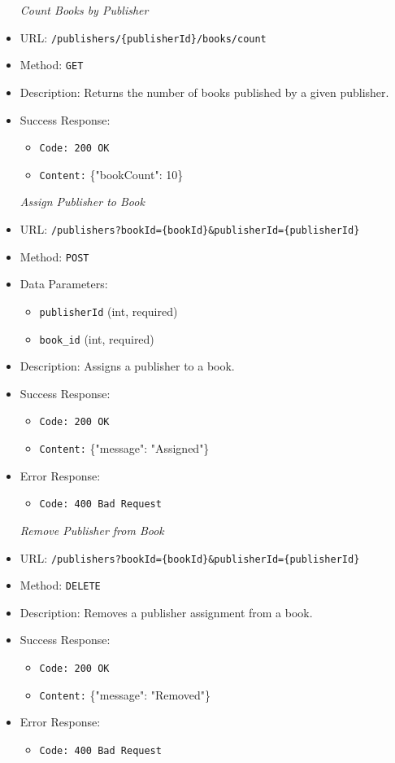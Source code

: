\begin{itemize}
\item[\textit{Count Books by Publisher}] 
\item URL: \texttt{/publishers/\{publisherId\}/books/count}  
\item Method: \texttt{GET}  
\item Description: Returns the number of books published by a given publisher.
\item Success Response:
\begin{itemize}
  \item \texttt{Code: 200 OK}
  \item \texttt{Content:} \{"bookCount": 10\}
\end{itemize}


\item[\textit{Assign Publisher to Book}]
\item URL: \texttt{/publishers?bookId=\{bookId\}&publisherId=\{publisherId\}}  
\item Method: \texttt{POST} 
\item Data Parameters:
\begin{itemize}
  \item \texttt{publisherId} (int, required)  
  \item \texttt{book\_id} (int, required)  
\end{itemize} 
\item Description: Assigns a publisher to a book.
\item Success Response:
\begin{itemize}
  \item \texttt{Code: 200 OK}
  \item \texttt{Content:} \{"message": "Assigned"\}
\end{itemize}
\item Error Response:
\begin{itemize}
  \item \texttt{Code: 400 Bad Request}
\end{itemize}


\item[\textit{Remove Publisher from Book}] 
\item URL: \texttt{/publishers?bookId=\{bookId\}&publisherId=\{publisherId\}}  
\item Method: \texttt{DELETE}  
\item Description: Removes a publisher assignment from a book.
\item Success Response:
\begin{itemize}
  \item \texttt{Code: 200 OK}
  \item \texttt{Content:} \{"message": "Removed"\}
\end{itemize}
\item Error Response:
\begin{itemize}
  \item \texttt{Code: 400 Bad Request}
\end{itemize}


\end{itemize}
